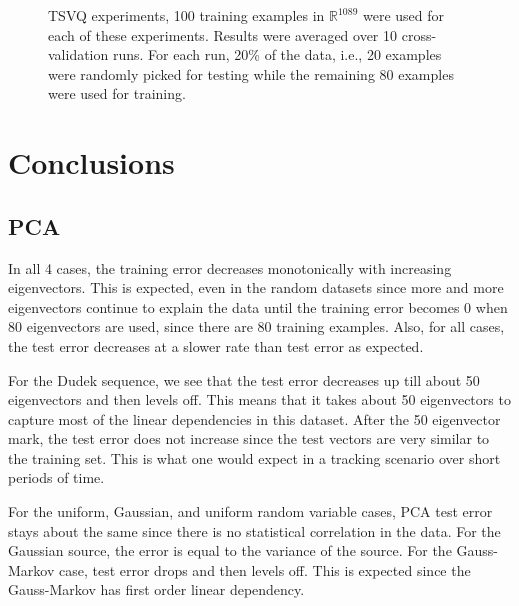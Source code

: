 \begin{figure}
\caption{TSVQ experiments, 100 training examples in $\mathbb{R}^{1089}$ were used for each of these experiments.  Results were averaged over 10 cross-validation runs.  For each run, 20\% of the data, i.e., 20 examples were randomly picked for testing while the remaining 80 examples were used for training.}
\label{fig:TSVQ_results}
\end{figure}


\section{Conclusions}
\subsection{PCA}
In all 4 cases, the training error decreases monotonically with increasing eigenvectors.  This is expected, even in the random datasets since more and more eigenvectors continue to explain the data until the training error becomes 0 when 80 eigenvectors are used, since there are 80 training examples.  Also, for all cases, the test error decreases at a slower rate than test error as expected. 

For the Dudek sequence, we see that the test error decreases up till about 50 eigenvectors and then levels off.  This means that it takes about 50 eigenvectors to capture most of the linear dependencies in this dataset.  After the 50 eigenvector mark, the test error does not increase since the test vectors are very similar to the training set.  This is what one would expect in a tracking scenario over short periods of time.  

For the uniform, Gaussian, and uniform random variable cases, PCA test error stays about the same since there is no statistical correlation in the data.  For the Gaussian source, the error is equal to the variance of the source.  For the Gauss-Markov case, test error drops and then levels off.  This is expected since the Gauss-Markov has first order linear dependency.

